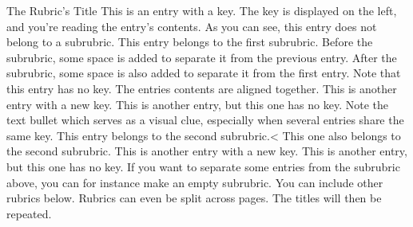
\begin{rubric}{The Rubric's Title}
\entry*[Key 1]
  This is an entry with a key. The key is displayed on the left, and you're
  reading the entry's contents. As you can see, this entry does not belong to
  a subrubric.
\entry*[Key 2]
  This entry belongs to the first subrubric. Before the subrubric,
  some space is added to separate it from the previous entry.
\entry*
  After the subrubric, some space is also added to separate it from the
  first entry. Note that this entry has no key. The entries contents are
  aligned together.
\entry*[Key 3]
  This is another entry with a new key.
\entry*
  This is another entry, but this one has no key. Note the text bullet
  which serves as a visual clue, especially when several entries share the
  same key.
\entry*[Key 1]
  This entry belongs to the second subrubric.<
\entry*
  This one also belongs to the second subrubric.
\entry*[Key 2]
  This is another entry with a new key.
\entry*
  This is another entry, but this one has no key.
\subrubric{}
\entry*[Key 3]
  If you want to separate some entries from the subrubric above,
  you can for instance make an empty subrubric.
\entry*
  You can include other rubrics below. Rubrics can even be split across
  pages. The titles will then be repeated.
\end{rubric}
